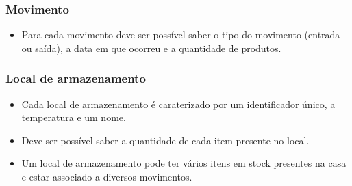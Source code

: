 \subsubsection{Movimento}
\begin{itemize}
	\item Para cada movimento deve ser possível saber o tipo do movimento (entrada ou saída), a data em que ocorreu e a quantidade de produtos. 
\end{itemize}

\subsubsection{Local de armazenamento}
\begin{itemize}
	\item Cada local de armazenamento é caraterizado por um identificador único, a temperatura e um nome.
	\item Deve ser possível saber a quantidade de cada item presente no local.
	\item Um local de armazenamento pode ter vários itens em stock presentes na casa e estar associado a diversos movimentos.
\end{itemize}

